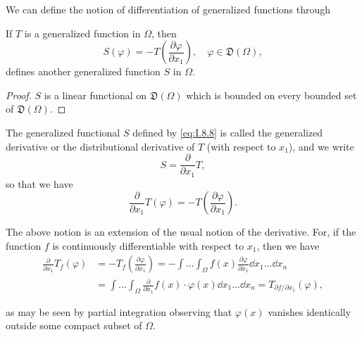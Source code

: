 We can define the notion of differentiation of generalized functions through 

\begin{proposition}\label{prop:I.8.Proposition.2} If $T$ is a generalized function in $\Omega$, then 
\begin{equation}\label{eq:I.8.8}
S (\varphi) =- T \left(\frac {\partial \varphi}{\partial x_{1}}\right), \quad \varphi \in \mathfrak {D} (\Omega),
\end{equation}
defines another generalized function $S$ in $\Omega$. 
\end{proposition}

\begin{proof}
 $S$ is a linear functional on $\mathfrak{D}(\Omega)$ which is bounded on every bounded set of $\mathfrak{D}(\Omega)$. 
\end{proof}

\begin{definition}\label{def:I.8.Definition.3} The generalized functional $S$ defined by \eqref{eq:I.8.8} is called the generalized derivative or the distributional derivative of $T$ (with respect to $x_{1}$), and we write 
\begin{equation}\label{eq:I.8.9}
S = \frac {\partial}{\partial x_{1}} T,
\end{equation}
so that we have 
\begin{equation}\label{eq:I.8.10}
\frac {\partial}{\partial x_{1}} T (\varphi) =- T \left(\frac {\partial \varphi}{\partial x_{1}}\right).
\end{equation}
\end{definition}

\begin{remarku} The above notion is an extension of the usual notion of the derivative. For, if the function $f$ is continuously differentiable with respect to $x_{1}$, then we have 
\[
\begin{aligned} \frac {\partial}{\partial x_{1}} T_{f} (\varphi) & =- T_{f} \left(\frac {\partial \varphi}{\partial x_{1}}\right) =- \int \dots \int_{\Omega} f (x) \frac {\partial \varphi}{\partial x_{1}} \dd x_{1} \dots \dd x_{n} \\ & = \int \dots \int_{\Omega} \frac {\partial}{\partial x_{1}} f (x) \cdot \varphi (x) \dd x_{1} \dots \dd x_{n} = T_ {\partial f / \partial x_{1}} (\varphi), \end{aligned}
\]
\end{remarku}

as may be seen by partial integration observing that $\varphi(x)$ vanishes identically outside some compact subset of $\Omega$. 

